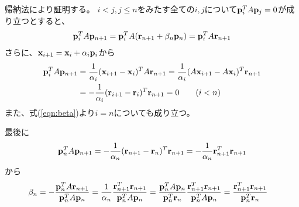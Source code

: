 \documentclass[11pt]{jarticle}
\begin{document}
帰納法により証明する。
$i < j, j \le n$をみたす全ての$i,j$について${\bf p}_i^T A {\bf p}_j = 0$が成り立つとすると、
\begin{align}
  {\bf p}_i^T A {\bf p}_{n+1} = {\bf p}_i^T A ({\bf r}_{n+1} + \beta_n {\bf p}_n) = {\bf p}_i^T A {\bf r}_{n+1}
\end{align}
さらに、${\bf x}_{i+1} = {\bf x}_i + \alpha_i {\bf p}_i$から
\begin{align}
  {\bf p}_i^T A {\bf p}_{n+1} &= \frac{1}{\alpha_i} ({\bf x}_{i+1} - {\bf x}_i)^T A {\bf r}_{n+1} = \frac{1}{\alpha_i} (A{\bf x}_{i+1} - A{\bf x}_i)^T {\bf r}_{n+1} \\ &= -\frac{1}{\alpha_i} ({\bf r}_{i+1} - {\bf r}_i)^T {\bf r}_{n+1} = 0 \qquad (i < n)
\end{align}
また、式(\ref{eqn:beta})より$i=n$についても成り立つ。

最後に
\begin{align}
  {\bf p}_n^T A {\bf p}_{n+1} = -\frac{1}{\alpha_n} ({\bf r}_{n+1} - {\bf r}_n)^T {\bf r}_{n+1} = -\frac{1}{\alpha_n} {\bf r}_{n+1}^T {\bf r}_{n+1}
\end{align}
から
\begin{align}
  \beta_n &= - \frac{{\bf p}_{n}^T A {\bf r}_{n+1}}{{\bf p}_n^T A {\bf p}_n}
  = \frac{1}{\alpha_n} \frac{{\bf r}_{n+1}^T {\bf r}_{n+1}}{{\bf p}_n^T A {\bf p}_n}
  = \frac{{\bf p}_n^T A {\bf p}_n}{{\bf p}_n^T {\bf r}_n} \frac{{\bf r}_{n+1}^T {\bf r}_{n+1}}{{\bf p}_n^T A {\bf p}_n}
  =  \frac{{\bf r}_{n+1}^T {\bf r}_{n+1}}{{\bf p}_n^T {\bf r}_n}
\end{align}
\end{document}
